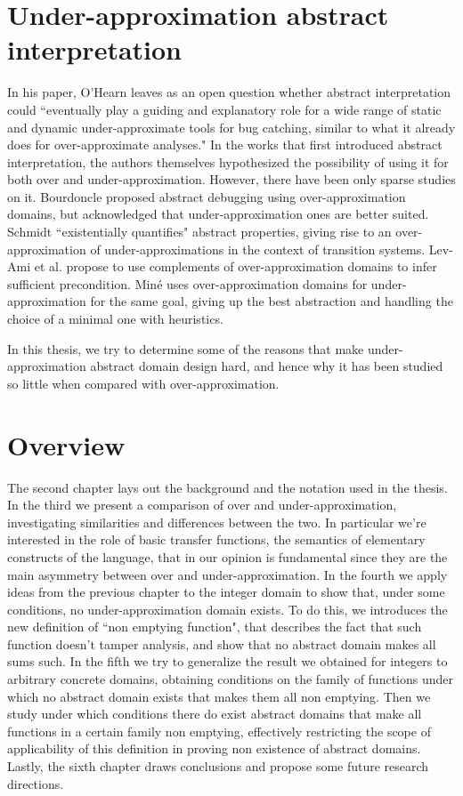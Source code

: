 \section{Under-approximation abstract interpretation}
In his paper, O'Hearn leaves as an open question whether abstract interpretation could ``eventually play a guiding and explanatory role for a wide range of static and dynamic under-approximate tools for bug catching, similar to what it already does for over-approximate analyses."
In the works that first introduced abstract interpretation, the authors themselves hypothesized the possibility of using it for both over and under-approximation. However, there have been only sparse studies on it.
Bourdoncle \cite{bourdoncle-abs-debugging} proposed abstract debugging using over-approximation domains, but acknowledged that under-approximation ones are better suited.
Schmidt \cite{schmidt-higher-order-approx-2007} ``existentially quantifies" abstract properties, giving rise to an over-approximation of under-approximations in the context of transition systems.
Lev-Ami et al. \cite{lev-backward-analysis-complement} propose to use complements of over-approximation domains to infer sufficient precondition.
Miné \cite{mine-backward-underapprox-14} uses over-approximation domains for under-approximation for the same goal, giving up the best abstraction and handling the choice of a minimal one with heuristics.

In this thesis, we try to determine some of the reasons that make under-approximation abstract domain design hard, and hence why it has been studied so little when compared with over-approximation.

\section{Overview}
The second chapter lays out the background and the notation used in the thesis.
In the third we present a comparison of over and under-approximation, investigating similarities and differences between the two. In particular we're interested in the role of basic transfer functions, the semantics of elementary constructs of the language, that in our opinion is fundamental since they are the main asymmetry between over and under-approximation.
In the fourth we apply ideas from the previous chapter to the integer domain to show that, under some conditions, no under-approximation domain exists. To do this, we introduces the new definition of ``non emptying function", that describes the fact that such function doesn't tamper analysis, and show that no abstract domain makes all sums such.
In the fifth we try to generalize the result we obtained for integers to arbitrary concrete domains, obtaining conditions on the family of functions under which no abstract domain exists that makes them all non emptying. Then we study under which conditions there do exist abstract domains that make all functions in a certain family non emptying, effectively restricting the scope of applicability of this definition in proving non existence of abstract domains.
Lastly, the sixth chapter draws conclusions and propose some future research directions.
